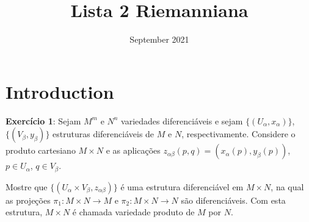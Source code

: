 \documentclass[twoside,openright,titlepage,numbers=noenddot,headinclude,  lineheaders footinclude=true,cleardoublepage=empty,BCOR=5mm,paper=a4,fontsize=12pt ]{scrbook}
\title{Lista 2 Riemanniana}
\author{}
\date{September 2021}
\begin{document}
\maketitle

\section{Introduction}

\textbf{Exercício 1}: Sejam $M^m$ e $N^n$ variedades diferenciáveis e sejam $\lbrace (U_{\alpha}, x_{\alpha}) \rbrace$, $\lbrace (V_{\beta}, y_{\beta}) \rbrace$ estruturas diferenciáveis de $M$ e $N$, respectivamente. Considere o produto cartesiano $M \times N$ e as aplicações $z_{\alpha \beta} (p, q) = (x_{\alpha}(p), y_{\beta}(p))$, $p \in U_{\alpha}$, $q \in V_{\beta}$.

Mostre que $\lbrace (U_{\alpha} \times V_{\beta}, z_{\alpha \beta}) \rbrace$ é uma estrutura diferenciável em $M \times N$, na qual as projeções $\pi _1 : M \times N \rightarrow M$ e $\pi _2 : M \times N \rightarrow N$ são diferenciáveis. Com esta estrutura, $M \times N$ é chamada variedade produto de $M$ por $N$.
\end{document}
